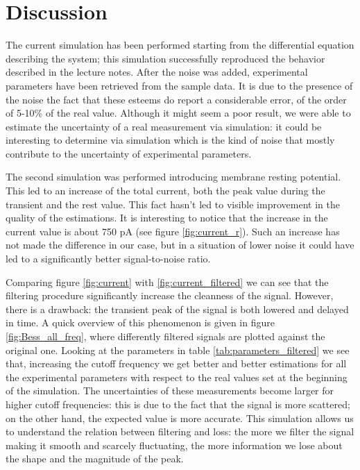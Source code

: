 \documentclass[a4paper]{article}
\begin{document}
\section{Discussion}

The current simulation has been performed starting from the differential equation describing the system; this simulation successfully reproduced the behavior described in the lecture notes.
After the noise was added, experimental parameters have been retrieved from the sample data.
It is due to the presence of the noise the fact that these esteems do report a considerable error, of the order of 5-10\% of the real value.
Although it might seem a poor result, we were able to estimate the uncertainty of a real measurement via simulation: it could be interesting to determine via simulation which is the kind of noise that mostly contribute to the uncertainty of experimental parameters.

The second simulation was performed introducing membrane resting potential.
This led to an increase of the total current, both the peak value during the transient and the rest value.
This fact hasn't led to visible improvement in the quality of the estimations.
It is interesting to notice that the increase in the current value is about 750 pA (see figure \ref{fig:current_r}).
Such an increase has not made the difference in our case, but in a situation of lower noise it could have led to a significantly better signal-to-noise ratio.

Comparing figure \ref{fig:current} with \ref{fig:current_filtered} we can see that the filtering procedure significantly increase the cleanness of the signal.
However, there is a drawback: the transient peak of the signal is both lowered and delayed in time.
A quick overview of this phenomenon is given in figure \ref{fig:Bess_all_freq}, where differently filtered signals are plotted against the original one.
Looking at the parameters in table \ref{tab:parameters_filtered} we see that, increasing the cutoff frequency we get better and better estimations for all the experimental parameters with respect to the real values set at the beginning of the simulation.
The uncertainties of these measurements become larger for higher cutoff frequencies: this is due to the fact that the signal is more scattered; on the other hand, the expected value is more accurate.
This simulation allows us to understand the relation between filtering and loss: the more we filter the signal making it smooth and scarcely fluctuating, the more information we lose about the shape and the magnitude of the peak.
\end{document}
